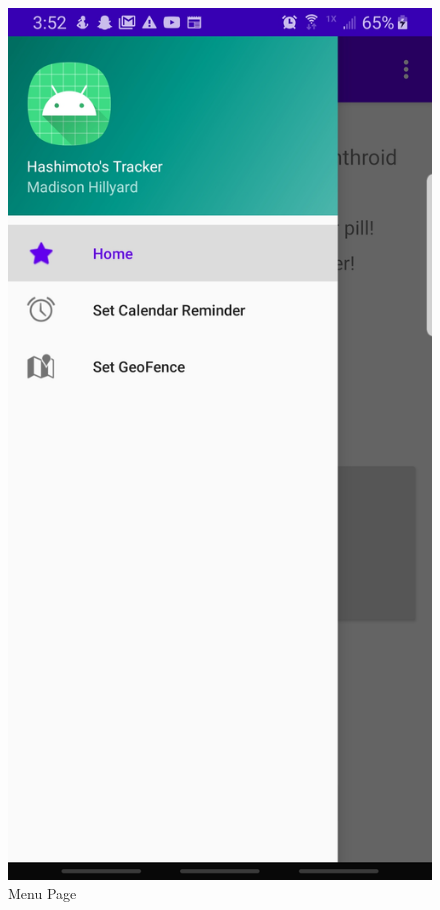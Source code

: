 \documentclass{article}
\begin{document}
\begin{figure}[H]
\centering
\includegraphics[scale= .1]{img/menu.jpg}
\caption{Menu Page}
\label{fig:menu} 
\end{figure}
\end{document}
